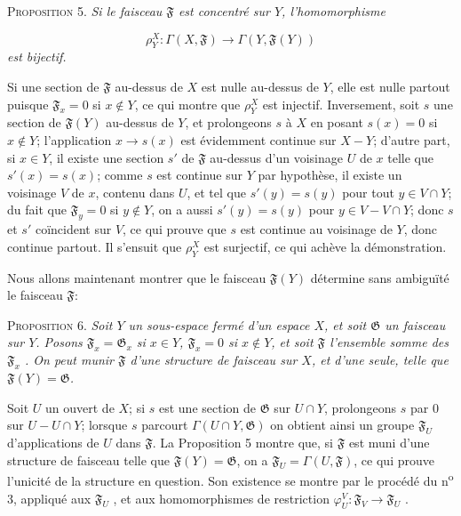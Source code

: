 \textsc{Proposition} 5. \textit{Si le faisceau $\mathfrak{F}$ est concentré sur $Y$, l'homomorphisme}

\begin{equation*}
\rho^{X}_{Y} : \Gamma(X, \mathfrak{F}) \to \Gamma(Y, \mathfrak{F}(Y))
\end{equation*}
\textit{est bijectif.}

Si une section de $\mathfrak{F}$ au-dessus de $X$ est nulle au-dessus de $Y$, elle est nulle partout puisque $\mathfrak{F}_x = 0$ si $x \notin Y$, ce qui montre que $\rho^{X}_{Y}$ est injectif. Inversement, soit $s$ une section de $\mathfrak{F}(Y)$ au-dessus de $Y$, et prolongeons $s$ à $X$ en posant $s(x) = 0$ si $x \notin Y$; l'application $x \to s(x)$ est évidemment continue sur $X - Y$; d'autre part, si $x \in Y$, il existe une section $s'$ de $\mathfrak{F}$ au-dessus d'un voisinage $U$ de $x$ telle que $s'(x) = s(x)$; comme $s$ est continue sur $Y$ par hypothèse, il existe un voisinage $V$ de $x$, contenu dans $U$, et tel que $s'(y) = s(y)$ pour tout $y \in V \cap Y$; du fait que $\mathfrak{F}_y = 0$ si $y \notin Y$, on a aussi $s'(y) = s(y)$ pour $y \in V - V \cap Y$; donc $s$ et $s'$ coïncident sur $V$, ce qui prouve que $s$ est continue au voisinage de $Y$, donc continue partout. Il s'ensuit que $\rho^{X}_{Y}$ est surjectif, ce qui achève la démonstration.

Nous allons maintenant montrer que le faisceau $\mathfrak{F}(Y)$ détermine sans ambiguïté le faisceau $\mathfrak{F}$:

\textsc{Proposition} 6. \textit{Soit $Y$ un sous-espace fermé d'un espace $X$, et soit $\mathfrak{G}$ un faisceau sur $Y$. Posons $\mathfrak{F}_x = \mathfrak{G}_x$ si $x \in Y$, $\mathfrak{F}_x = 0$ si $x \notin Y$, et soit $\mathfrak{F}$ l'ensemble somme des $\mathfrak{F}_x$ . On peut munir $\mathfrak{F}$ d'une structure de faisceau sur $X$, et d'une seule, telle que $\mathfrak{F}(Y) = \mathfrak{G}$.}

Soit $U$ un ouvert de $X$; si $s$ est une section de $\mathfrak{G}$ sur $U \cap Y$, prolongeons $s$ par $0$ sur $U - U \cap Y$; lorsque $s$ parcourt $\Gamma(U \cap Y, \mathfrak{G})$ on obtient ainsi un groupe $\mathfrak{F}_U$ d'applications de $U$ dans $\mathfrak{F}$. La Proposition 5 montre que, si $\mathfrak{F}$ est muni d'une structure de faisceau telle que $\mathfrak{F}(Y) = \mathfrak{G}$, on a $\mathfrak{F}_U = \Gamma(U, \mathfrak{F})$, ce qui prouve l'unicité de la structure en question. Son existence se montre par le procédé du n\textsuperscript{o} 3, appliqué aux $\mathfrak{F}_U$ , et aux homomorphismes de restriction $\varphi^{V}_{U} : \mathfrak{F}_V \to \mathfrak{F}_U$ .

